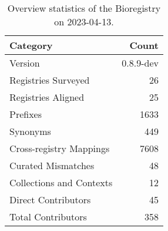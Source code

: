 \begin{table}
\caption{Overview statistics of the Bioregistry on 2023-04-13.}
\label{tab:bioregistry-summary}
\begin{tabular}{lr}
\toprule
Category & Count \\
\midrule
Version & 0.8.9-dev \\
Registries Surveyed & 26 \\
Registries Aligned & 25 \\
Prefixes & 1633 \\
Synonyms & 449 \\
Cross-registry Mappings & 7608 \\
Curated Mismatches & 48 \\
Collections and Contexts & 12 \\
Direct Contributors & 45 \\
Total Contributors & 358 \\
\bottomrule
\end{tabular}
\end{table}
